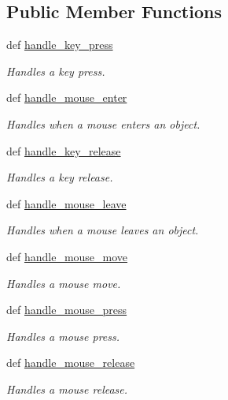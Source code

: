 \subsection*{Public Member Functions}
\begin{DoxyCompactItemize}
\item 
def \hyperlink{classtext__move_1_1Handler_a5a42b4eb6df32fce14be58a45a7a82f0}{handle\_\-key\_\-press}
\begin{DoxyCompactList}\small\item\em Handles a key press. \item\end{DoxyCompactList}\item 
def \hyperlink{classtext__move_1_1Handler_a51652a1d51554e661117de1ee7856169}{handle\_\-mouse\_\-enter}
\begin{DoxyCompactList}\small\item\em Handles when a mouse enters an object. \item\end{DoxyCompactList}\item 
def \hyperlink{classcs110graphics_1_1EventHandler_a2849f60251baa44252992162521f2473}{handle\_\-key\_\-release}
\begin{DoxyCompactList}\small\item\em Handles a key release. \item\end{DoxyCompactList}\item 
def \hyperlink{classcs110graphics_1_1EventHandler_a5deaf2b6b8055e97ac0ddf6603132c64}{handle\_\-mouse\_\-leave}
\begin{DoxyCompactList}\small\item\em Handles when a mouse leaves an object. \item\end{DoxyCompactList}\item 
def \hyperlink{classcs110graphics_1_1EventHandler_a521fdcd170d15c0b8baa124c78b6d1ef}{handle\_\-mouse\_\-move}
\begin{DoxyCompactList}\small\item\em Handles a mouse move. \item\end{DoxyCompactList}\item 
def \hyperlink{classcs110graphics_1_1EventHandler_a547873123ebcd3fcc63a2e03d2a2fee3}{handle\_\-mouse\_\-press}
\begin{DoxyCompactList}\small\item\em Handles a mouse press. \item\end{DoxyCompactList}\item 
def \hyperlink{classcs110graphics_1_1EventHandler_a320a7dbf68d37e0101b237bff1713088}{handle\_\-mouse\_\-release}
\begin{DoxyCompactList}\small\item\em Handles a mouse release. \item\end{DoxyCompactList}\end{DoxyCompactItemize}


